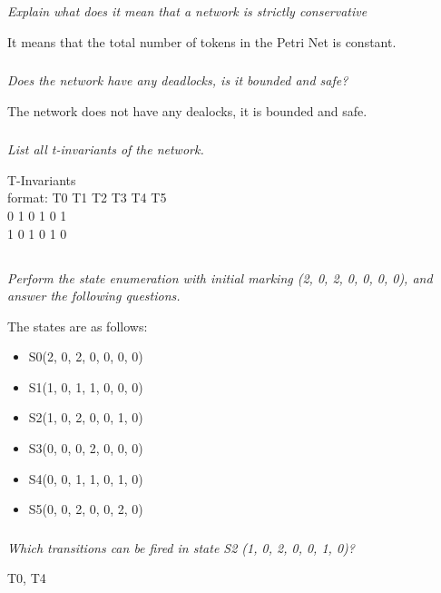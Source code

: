 \documentclass[letterpaper]{article}
\begin{document}
\subsubsection{}
\textit{Explain what does it mean that a network is strictly conservative}

It means that the total number of tokens in the Petri Net is constant.

\subsubsection{}
\textit{Does the network have any deadlocks, is it bounded and safe?}

The network does not have any dealocks, it is bounded and safe.

\subsubsection{}
\textit{List all t-invariants of the network.}

T-Invariants\\
format: T0 T1 T2 T3 T4 T5 \\
0 1 0 1 0 1 \\
1 0 1 0 1 0 \\

\subsection{}
\textit{Perform the state enumeration with initial marking (2, 0, 2, 0, 0, 0, 0), and answer the following questions.}

The states are as follows:
\begin{itemize}
 \item S0(2, 0, 2, 0, 0, 0, 0)
 \item S1(1, 0, 1, 1, 0, 0, 0)
 \item S2(1, 0, 2, 0, 0, 1, 0)
 \item S3(0, 0, 0, 2, 0, 0, 0)
 \item S4(0, 0, 1, 1, 0, 1, 0)
 \item S5(0, 0, 2, 0, 0, 2, 0)
\end{itemize}

\subsubsection{}
\textit{Which transitions can be fired in state S2 (1, 0, 2, 0, 0, 1, 0)?}

T0, T4
\end{document}
